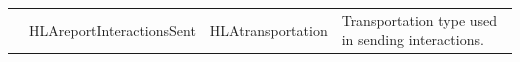 \begin{landscape}
\begin{momtabletypeset}[8.00]
{{\begin{tabular}{|Y{146.95pt}|Y{146.60pt}|Y{126.62pt}|Y{211.97pt}|}
                    & HLAreportInteractionsSent     & HLAtransportation    & Transportation type used in sending interactions.\allowbreak{}                                                                                                                                                                                                                                                                                                                                                                                                                                                                                                                                                                                                                                                                                                                                                                                                                                                                                                                                                                                                                                                                                                                                                                                                                                                                                                                                                                                                                                                                                                                                                                        \\

\end{tabular}}}
\end{momtabletypeset}
\end{landscape}
